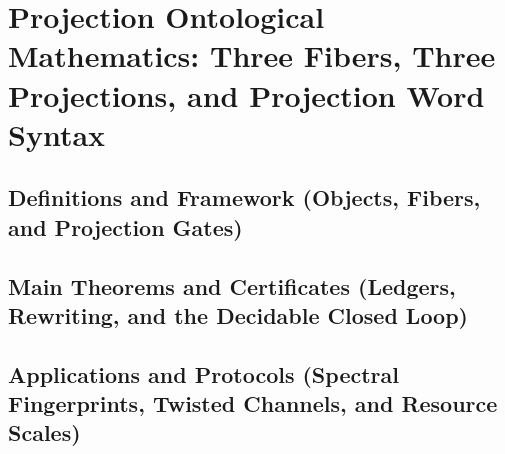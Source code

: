 \section{Projection Ontological Mathematics: Three Fibers, Three Projections, and Projection Word Syntax}\label{sec:pom}

\subsection{Definitions and Framework (Objects, Fibers, and Projection Gates)}





\subsection{Main Theorems and Certificates (Ledgers, Rewriting, and the Decidable Closed Loop)}






















\subsection{Applications and Protocols (Spectral Fingerprints, Twisted Channels, and Resource Scales)}

















